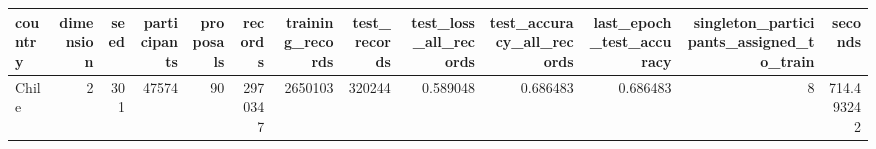 \begin{tabular}{lrrrrrrrrrrrr}
\toprule
country & dimension & seed & participants & proposals & records & training_records & test_records & test_loss_all_records & test_accuracy_all_records & last_epoch_test_accuracy & singleton_participants_assigned_to_train & seconds \\
\midrule
Chile & 2 & 301 & 47574 & 90 & 2970347 & 2650103 & 320244 & 0.589048 & 0.686483 & 0.686483 & 8 & 714.493242 \\
\bottomrule
\end{tabular}
